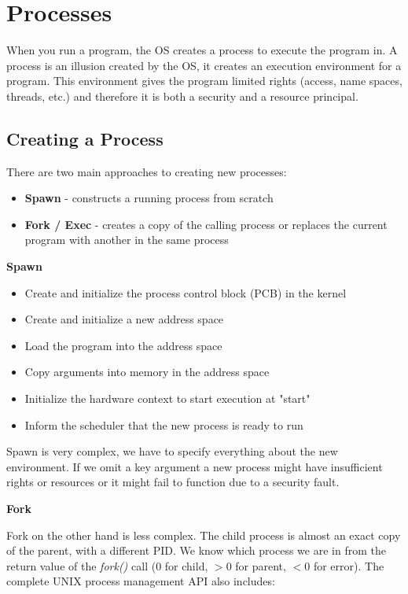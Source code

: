 \section{Processes}

When you run a program, the OS creates a process to execute the program in. A process is an illusion created by the OS, it creates an execution environment for a program. This environment gives the program limited rights (access, name spaces, threads, etc.) and therefore it is both a security and a resource principal.


\subsection{Creating a Process}

There are two main approaches to creating new processes:

\begin{itemize}
	\item \textbf{Spawn} - constructs a running process from scratch
	\item \textbf{Fork / Exec} - creates a copy of the calling process or replaces the current program with another in the same process
\end{itemize}

\textbf{Spawn}

\begin{itemize}
	\item Create and initialize the process control block (PCB) in the kernel
	\item Create and initialize a new address space
	\item Load the program into the address space
	\item Copy arguments into memory in the address space
	\item Initialize the hardware context to start execution at "start"
	\item Inform the scheduler that the new process is ready to run
\end{itemize}

Spawn is very complex, we have to specify everything about the new environment. If we omit a key argument a new process might have insufficient rights or resources or it might fail to function due to a security fault. \medskip

\textbf{Fork}

Fork on the other hand is less complex. The child process is almost an exact copy of the parent, with a different PID. We know which process we are in from the return value of the \textit{fork()} call ($0$ for child, $>0$ for parent, $<0$ for error). The complete UNIX process management API also includes:

